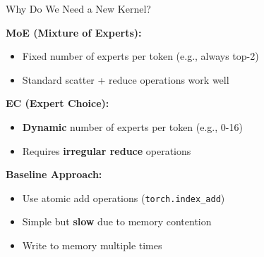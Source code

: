 \documentclass{beamer}
\begin{document}
\begin{frame}{Why Do We Need a New Kernel?}

\textbf{MoE (Mixture of Experts):}
\begin{itemize}
    \item Fixed number of experts per token (e.g., always top-2)
    \item Standard scatter + reduce operations work well
\end{itemize}

\vspace{0.4cm}

\textbf{EC (Expert Choice):}
\begin{itemize}
    \item \textbf{Dynamic} number of experts per token (e.g., 0-16)
    \item Requires \textbf{irregular reduce} operations
\end{itemize}

\vspace{0.4cm}

\textbf{Baseline Approach:}
\begin{itemize}
    \item Use atomic add operations (\texttt{torch.index\_add})
    \item Simple but \textbf{slow} due to memory contention
    \item Write to memory multiple times
\end{itemize}

\end{frame}
\end{document}
